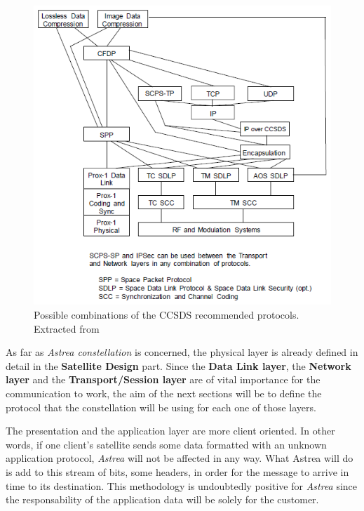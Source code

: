\begin{figure}[H]
\begin{center}
\includegraphics[scale=0.6]{SpaceSegment/Layer3/CCSDScombinations.png}
\caption[Possible combinations of the CCSDS protocols]{Possible combinations of the CCSDS recommended protocols. Extracted from \cite{CCSDSOverview}}
\end{center}
\end{figure}

As far as \textit{Astrea constellation} is concerned, the physical layer is already defined in detail in the \textbf{Satellite Design} part. Since the\textbf{ Data Link layer}, the \textbf{Network layer} and the \textbf{Transport/Session layer} are of vital importance for the communication to work, the aim of the next sections will be to define the protocol that the constellation will be using for each one of those layers.

The presentation and the application layer are more client oriented. In other words, if one client's satellite sends some data formatted with an unknown application protocol, \textit{Astrea} will not be affected in any way. What Astrea will do is add to this stream of bits, some headers, in order for the message to arrive in time to its destination. This methodology is undoubtedly positive for \textit{Astrea} since the responsability of the application data will be solely for the customer.